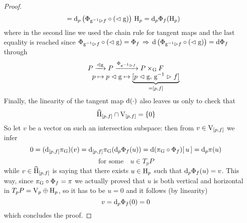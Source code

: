 \begin{proof}
\begin{align*}
    &=\text{\normalfont d}_p\left(\Phi_{\text{\normalfont g}^{-1}\vartriangleright f}\circ(\vartriangleleft\text{\normalfont g})\right)\,\text{\normalfont H}_p=\text{\normalfont d}_p\Phi_f(\text{\normalfont H}_p)
\end{align*}
where in the second line we used the chain rule for tangent maps and the last equality is reached since $\Phi_{\text{\normalfont g}^{-1}\vartriangleright f}\circ(\vartriangleleft\text{\normalfont g})=\Phi_f\,\Rightarrow\,\text{\normalfont d}\left(\Phi_{\text{\normalfont g}^{-1}\vartriangleright f}\circ(\vartriangleleft\text{\normalfont g})\right)=\text{\normalfont d}\Phi_f$ through
$$\begin{matrix}
    P\xrightarrow{\vartriangleleft\text{\normalfont g}}P\xrightarrow{\Phi_{\text{\normalfont g}^{-1}\vartriangleright f}}P\times_{\text{\normalfont G}} F\\
    \qquad\quad p\mapsto p\vartriangleleft\text{\normalfont g}\mapsto\underbrace{[p\vartriangleleft\text{\normalfont g},\,\text{\normalfont g}^{-1}\vartriangleright f]}_{=[p,f]}
\end{matrix}$$
Finally, the linearity of the tangent map $\text{\normalfont d}(\cdot)$ also leaves us only to check that $$\widehat{\text{\normalfont H}}_{[p,f]}\cap\text{\normalfont V}_{[p,f]}=\{0\}$$
So let $v$ be a vector on such an intersection subspace: then from $v\in\text{\normalfont V}_{[p,f]}$ we infer
$$0=(\text{\normalfont d}_{[p,f]}\pi_{\text{\normalfont G}})(v)=\text{\normalfont d}_{[p,f]}\pi_{\text{\normalfont G}}(\text{\normalfont d}_p\Phi_f(u))=\text{\normalfont d}(\pi_{\text{\normalfont G}}\circ\Phi_f)[\,u\,]=\text{\normalfont d}_p\pi(u)$$
$$\text{for some}\quad u\in T_pP$$
while $v\in\widehat{\text{\normalfont H}}_{[p,f]}$ is saying that there exists $u\in\text{\normalfont H}_p$ such that $\text{\normalfont d}_p\Phi_f(u)=v$. This way, since $\pi_{\text{\normalfont G}}\circ\Phi_f=\pi$ we actually proved that $u$ is both vertical and horizontal in $T_pP=\text{\normalfont V}_p\oplus\text{\normalfont H}_p$, so it has to be $u=0$ and it follows (by linearity)
$$v=\text{\normalfont d}_p\Phi_f(0)=0$$
which concludes the proof.
\end{proof}



